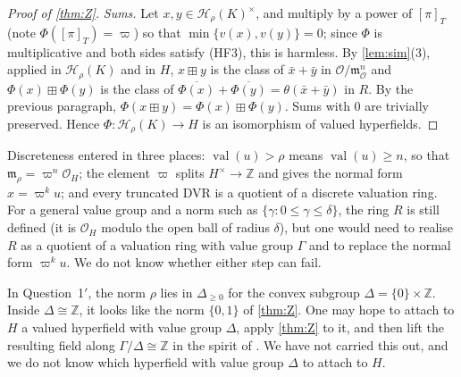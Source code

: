 \documentclass[11pt]{amsart}
\numberwithin{equation}{section}
\newcommand{\hplus}{\boxplus}
\newcommand{\val}{\operatorname{val}}
\newcommand{\m}{\mathfrak m}
\newcommand{\Hr}{\mathcal H_\rho}
\newcommand{\Z}{\mathbb Z}
\newcommand{\cls}[1]{[#1]}
\begin{document}
\begin{proof}[Proof of \cref{thm:Z}]
\emph{Sums.} Let $x,y\in\Hr(K)^\times$, and multiply by a power of $\cls\pi_T$ (note $\Phi(\cls\pi_T)=\varpi$) so that $\min\{v(x),v(y)\}=0$; since $\Phi$ is multiplicative and both sides satisfy (HF3), this is harmless. By \cref{lem:sim}(3), applied in $\Hr(K)$ and in $H$, $x\hplus y$ is the class of $\bar x+\bar y$ in $\mathcal O/\m^n_{\mathcal O}$ and $\Phi(x)\hplus\Phi(y)$ is the class of $\overline{\Phi(x)}+\overline{\Phi(y)}=\theta(\bar x+\bar y)$ in $R$. By the previous paragraph, $\Phi(x\hplus y)=\Phi(x)\hplus\Phi(y)$. Sums with $0$ are trivially preserved. Hence $\Phi\colon\Hr(K)\to H$ is an isomorphism of valued hyperfields.
\end{proof}

\begin{remark}\label{rem:discrete-uses}
Discreteness entered in three places: $\val(u)>\rho$ means $\val(u)\ge n$, so that $\m_\rho=\varpi^n\mathcal O_H$; the element $\varpi$ splits $H^\times\to\Z$ and gives the normal form $x=\varpi^ku$; and every truncated DVR is a quotient of a discrete valuation ring. For a general value group and a norm such as $\{\gamma:0\le\gamma\le\delta\}$, the ring $R$ is still defined (it is $\mathcal O_H$ modulo the open ball of radius $\delta$), but one would need to realise $R$ as a quotient of a valuation ring with value group $\Gamma$ and to replace the normal form $\varpi^ku$. We do not know whether either step can fail.
\end{remark}

\begin{remark}\label{rem:heuristic}
In Question~1$'$, the norm $\rho$ lies in $\Delta_{\ge0}$ for the convex subgroup $\Delta=\{0\}\times\Z$. Inside $\Delta\cong\Z$, it looks like the norm $\{0,1\}$ of \cref{thm:Z}. One may hope to attach to $H$ a valued hyperfield with value group $\Delta$, apply \cref{thm:Z} to it, and then lift the resulting field along $\Gamma/\Delta\cong\Z$ in the spirit of \cite[Theorem~4.1]{LT25}. We have not carried this out, and we do not know which hyperfield with value group $\Delta$ to attach to $H$.
\end{remark}
\end{document}

